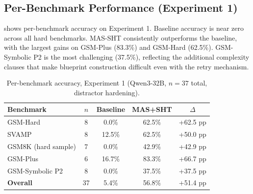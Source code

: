 \documentclass[11pt,a4paper]{article}
\begin{document}
\subsection{Per-Benchmark Performance (Experiment 1)}
 shows per-benchmark accuracy on Experiment 1.
Baseline accuracy is near zero across all hard benchmarks.
MAS-SHT consistently outperforms the baseline, with the largest gains on GSM-Plus (83.3\%) and GSM-Hard (62.5\%).
GSM-Symbolic P2 is the most challenging (37.5\%), reflecting the additional complexity clauses that make blueprint construction difficult even with the retry mechanism.
\begin{table}[h]
\centering
\caption{Per-benchmark accuracy, Experiment 1 (Qwen3-32B, $n=37$ total, distractor hardening).}
\label{tab:per_benchmark}
\begin{tabular}{lcccc}
\toprule
\textbf{Benchmark} & \textbf{$n$} & \textbf{Baseline} & \textbf{MAS+SHT} & \textbf{$\Delta$} \\
\midrule
GSM-Hard            & 8  & 0.0\%   & 62.5\%  & +62.5 pp \\
SVAMP               & 8  & 12.5\%  & 62.5\%  & +50.0 pp \\
GSM8K (hard sample) & 7  & 0.0\%   & 42.9\%  & +42.9 pp \\
GSM-Plus            & 6  & 16.7\%  & 83.3\%  & +66.7 pp \\
GSM-Symbolic P2     & 8  & 0.0\%   & 37.5\%  & +37.5 pp \\
\midrule
\textbf{Overall}    & 37 & 5.4\%   & 56.8\%  & +51.4 pp \\
\bottomrule
\end{tabular}
\end{table}
\end{document}
